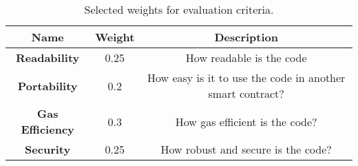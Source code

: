 \begin{table}[H]
	\centering
	\vspace*{-1ex}
	\caption{Selected weights for evaluation criteria.} 
	\scriptsize
	\vspace{-1ex}
	\begin{tabular}{|c|c|c|}
        \hline
        \textbf{Name} & \textbf{Weight}  & \textbf{Description}\\ \hline 
        \textbf{Readability} & 0.25 & How readable is the code\\
        \textbf{Portability} & 0.2 & How easy is it to use the code in another smart contract? \\
        \textbf{Gas Efficiency} & 0.3 & How gas efficient is the code? \\
        \textbf{Security} & 0.25 & How robust and secure is the code? \\
        \hline
    \end{tabular}
    \label{table:weights}
\end{table}
